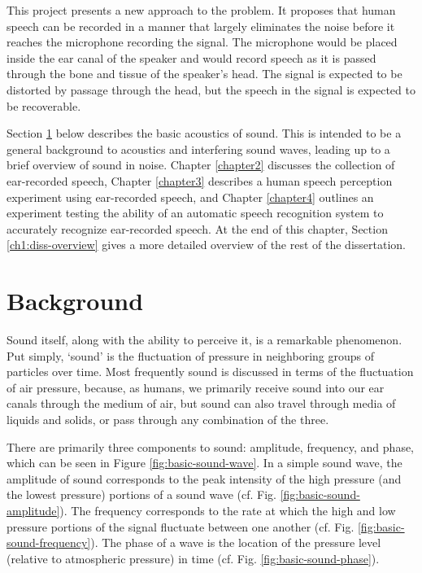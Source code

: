 This project presents a new approach to the problem.  It proposes that human speech can be recorded in a manner that largely eliminates the noise before it reaches the microphone recording the signal.  The microphone would be placed inside the ear canal of the speaker and would record speech as it is passed through the bone and tissue of the speaker's head.  The signal is expected to be distorted by passage through the head, but the speech in the signal is expected to be recoverable.

Section \ref{ch1:background} below describes the basic acoustics of sound.  This is intended to be a general background to acoustics and interfering sound waves, leading up to a brief overview of sound in noise. Chapter \ref{chapter2} discusses the collection of ear-recorded speech, Chapter \ref{chapter3} describes a human speech perception experiment using ear-recorded speech, and Chapter \ref{chapter4} outlines an experiment testing the ability of an automatic speech recognition system to accurately recognize ear-recorded speech.  At the end of this chapter, Section \ref{ch1:diss-overview} gives a more detailed overview of the rest of the dissertation.

\section{Background}\label{ch1:background}

Sound itself, along with the ability to perceive it, is a remarkable phenomenon.  Put simply, `sound' is the fluctuation of pressure in neighboring groups of particles over time. Most frequently sound is discussed in terms of the fluctuation of air pressure, because, as humans, we primarily receive sound into our ear canals through the medium of air, but sound can also travel through media of liquids and solids, or pass through any combination of the three.

There are primarily three components to sound: amplitude, frequency, and phase, which can be seen in Figure \ref{fig:basic-sound-wave}.  In a simple sound wave, the amplitude of sound corresponds to the peak intensity of the high pressure (and the lowest pressure) portions of a sound wave (cf. Fig. \ref{fig:basic-sound-amplitude}).  The frequency corresponds to the rate at which the high and low pressure portions of the signal fluctuate between one another (cf. Fig. \ref{fig:basic-sound-frequency}).  The phase of a wave is the location of the pressure level (relative to atmospheric pressure) in time (cf. Fig. \ref{fig:basic-sound-phase}).   

